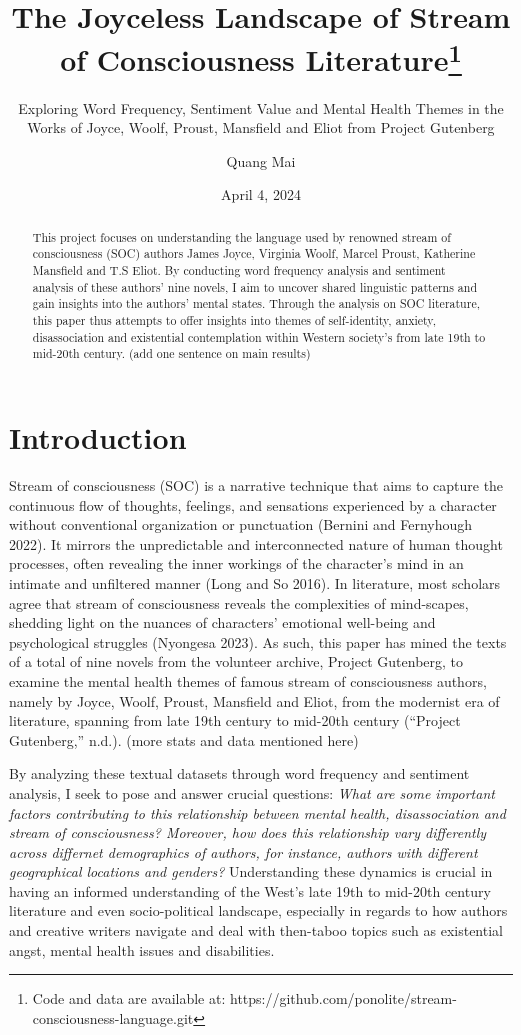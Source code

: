 \documentclass[
  letterpaper,
  DIV=11,
  numbers=noendperiod]{scrartcl}
\title{The Joyceless Landscape of Stream of Consciousness
Literature\thanks{Code and data are available at:
https://github.com/ponolite/stream-consciousness-language.git}}
\subtitle{Exploring Word Frequency, Sentiment Value and Mental Health
Themes in the Works of Joyce, Woolf, Proust, Mansfield and Eliot from
Project Gutenberg}
\author{Quang Mai}
\date{April 4, 2024}
\renewcommand*\contentsname{Table of contents}
\newcommand\contentsname{Table of contents}
\begin{document}
\maketitle
\begin{abstract}
This project focuses on understanding the language used by renowned
stream of consciousness (SOC) authors James Joyce, Virginia Woolf,
Marcel Proust, Katherine Mansfield and T.S Eliot. By conducting word
frequency analysis and sentiment analysis of these authors' nine novels,
I aim to uncover shared linguistic patterns and gain insights into the
authors' mental states. Through the analysis on SOC literature, this
paper thus attempts to offer insights into themes of self-identity,
anxiety, disassociation and existential contemplation within Western
society's from late 19th to mid-20th century. (add one sentence on main
results)
\end{abstract}

\renewcommand*\contentsname{Table of contents}
{
\hypersetup{linkcolor=}
\setcounter{tocdepth}{3}
\tableofcontents
}
\section{Introduction}\label{introduction}

Stream of consciousness (SOC) is a narrative technique that aims to
capture the continuous flow of thoughts, feelings, and sensations
experienced by a character without conventional organization or
punctuation (Bernini and Fernyhough 2022). It mirrors the unpredictable
and interconnected nature of human thought processes, often revealing
the inner workings of the character's mind in an intimate and unfiltered
manner (Long and So 2016). In literature, most scholars agree that
stream of consciousness reveals the complexities of mind-scapes,
shedding light on the nuances of characters' emotional well-being and
psychological struggles (Nyongesa 2023). As such, this paper has mined
the texts of a total of nine novels from the volunteer archive, Project
Gutenberg, to examine the mental health themes of famous stream of
consciousness authors, namely by Joyce, Woolf, Proust, Mansfield and
Eliot, from the modernist era of literature, spanning from late 19th
century to mid-20th century ({``Project Gutenberg,''} n.d.). (more stats
and data mentioned here)

By analyzing these textual datasets through word frequency and sentiment
analysis, I seek to pose and answer crucial questions:
\textit{What are some important factors contributing to this relationship between mental health, disassociation and stream of consciousness? Moreover, how does this relationship vary differently across differnet demographics of authors, for instance, authors with different geographical locations and genders?}
Understanding these dynamics is crucial in having an informed
understanding of the West's late 19th to mid-20th century literature and
even socio-political landscape, especially in regards to how authors and
creative writers navigate and deal with then-taboo topics such as
existential angst, mental health issues and disabilities.
\end{document}
